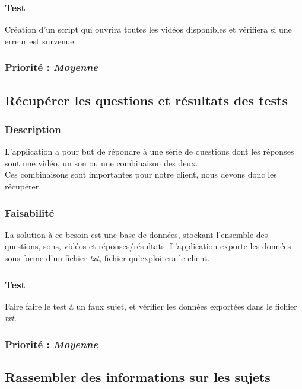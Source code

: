 \subsubsection{Test}

Création d’un script qui ouvrira toutes les vidéos disponibles et vérifiera si une erreur est survenue.

\subsubsection{Priorité : \textit{Moyenne}}

\subsection{Récupérer les questions et résultats des tests}

\subsubsection{Description}

L’application a pour but de répondre à une série de questions dont les réponses sont une vidéo, un son ou une combinaison des deux.\\
Ces combinaisons sont importantes pour notre client, nous devons donc les récupérer.

\subsubsection{Faisabilité}

La solution à ce besoin est une base de données, stockant l’ensemble des questions, sons, vidéos et réponses/résultats.
L’application exporte les données sous forme d’un fichier \textit{txt}, fichier qu’exploitera le client.   

\subsubsection{Test}

Faire faire le test à un faux sujet, et vérifier les données exportées dans le fichier \textit{txt}.

\subsubsection{Priorité : \textit{Moyenne}}

\subsection{Rassembler des informations sur les sujets}

